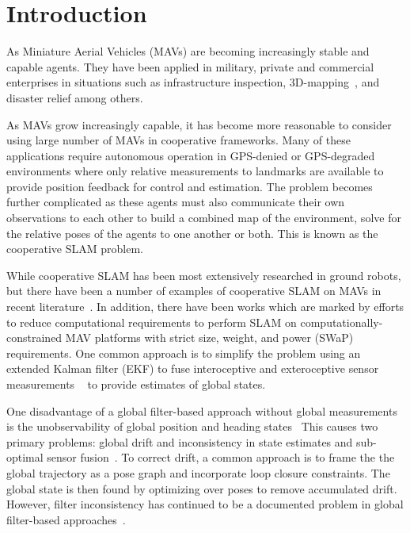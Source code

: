 
\section{Introduction}
As Miniature Aerial Vehicles (MAVs) are becoming increasingly stable and capable agents. They have been applied in military, private and commercial enterprises in situations such as infrastructure inspection\cite{Steich2016, Ham2016}, 3D-mapping~\cite{Remondino2011}, and disaster relief\cite{Adams2011} among others.

As MAVs grow increasingly capable, it has become more reasonable to consider using large number of MAVs in cooperative frameworks. Many of these applications require autonomous operation in GPS-denied or GPS-degraded environments where only relative measurements to landmarks are available to provide position feedback for control and estimation.  The problem becomes further complicated as these agents must also communicate their own observations to each other to build a combined map of the environment, solve for the relative poses of the agents to one another or both. This is known as the cooperative SLAM problem.

While cooperative SLAM has been most extensively researched in ground robots, but there have been a number of examples of cooperative SLAM on MAVs in recent literature~\cite{Loianno2015, Achtelik2012, Lawson2015}. In addition, there have been works which are marked by efforts to reduce computational requirements to perform SLAM on computationally-constrained MAV platforms with strict size, weight, and power (SWaP) requirements.  One common approach is to simplify the problem using an extended Kalman filter (EKF) to fuse interoceptive and exteroceptive sensor measurements
~\cite{Bachrach2010a, Wheeler2017b, Achtelik2009, Ahrens2009, Chowdary2013} to provide estimates of global states.

One disadvantage of a global filter-based approach without global measurements is the unobservability of global position and heading states~\cite{Martinelli2012,Weiss2012,Jones2007} This causes two primary problems: global drift and inconsistency in state estimates and sub-optimal sensor fusion~\cite{Bailey2006Consistency,Bar-Shalom2002}. To correct drift, a common approach is to frame the the global trajectory as a pose graph and incorporate loop closure constraints.  The global state is then found by optimizing over poses to remove accumulated drift.  However, filter inconsistency has continued to be a documented problem in global filter-based approaches~\cite{Wheeler2017a}.

